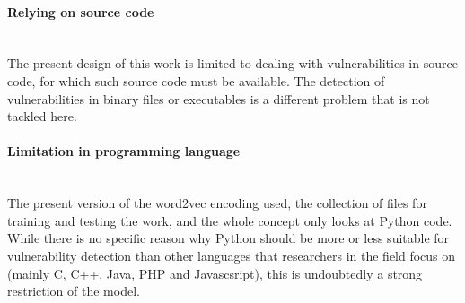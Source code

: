 \documentclass[
a4paper,
pagesize,
pdftex,
12pt,
twoside, %
BCOR=5mm, %
ngerman,
fleqn,
final,
]{scrartcl}
\begin{document}
	\paragraph{Relying on source code}\mbox{}\\
	The present design of this work is limited to dealing with vulnerabilities in source code, for which such source code must be available. The detection of vulnerabilities in binary files or executables is a different problem that is not tackled here. 
	\paragraph{Limitation in programming language}\mbox{}\\
	The present version of the word2vec encoding used, the collection of files for training and testing the work, and the whole concept only looks at Python code. While there is no specific reason why Python should be more or less suitable for vulnerability detection than other languages that researchers in the field focus on (mainly C, C++, Java, PHP and Javascsript), this is undoubtedly a strong restriction of the model.
	
	
\end{document}
